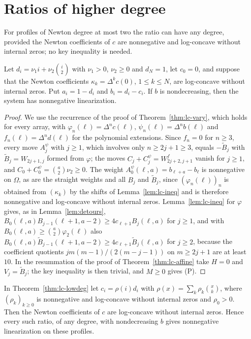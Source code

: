 \section{Ratios of higher degree}\label{sec:higher}
For profiles of Newton degree at most two the ratio can have any degree, provided the Newton coefficients of $c$ are nonnegative and log-concave without internal zeros; no key inequality is needed.

\begin{theorem}\label{thm:lc-lowdeg}
Let $d_i=\nu_1i+\nu_2\binom i2$ with $\nu_1>0$, $\nu_2\geq0$ and $d_N=1$, let $c_0=0$, and suppose that the Newton coefficients $\kappa_k=\Delta^kc(0)$, $1\leq k\leq N$, are log-concave without internal zeros. Put $a_i=1-d_i$ and $b_i=d_i-c_i$. If $b$ is nondecreasing, then the system has nonnegative linearization.
\end{theorem}

\begin{proof}
We use the recurrence of the proof of Theorem~\ref{thm:lc-vary}, which holds for every array, with $\varphi_n(\ell)=\Delta^nc(\ell)$, $\psi_n(\ell)=\Delta^nb(\ell)$ and $f_n(\ell)=\Delta^nd(\ell)$ for the polynomial extensions. Since $f_n=0$ for $n\geq3$, every move $A^\psi_j$ with $j\geq1$, which involves only $n\geq2j+1\geq3$, equals $-\widetilde B_j$ with $\widetilde B_j=W_{2j+1,j}$ formed from $\varphi$; the moves $C_j+C^\psi_j=W^f_{2j+2,j+1}$ vanish for $j\geq1$, and $C_0+C^\psi_0=\binom a2\nu_2\geq0$. The weight $A^\psi_0(\ell,a)=b_{\ell+a}-b_\ell$ is nonnegative on $\Omega$, as are the straight weights and all $B_j$ and $\widetilde B_j$, since $(\varphi_n(\ell))_n$ is obtained from $(\kappa_k)$ by the shifts of Lemma~\ref{lem:lc-ineq} and is therefore nonnegative and log-concave without internal zeros. Lemma~\ref{lem:lc-ineq} for $\varphi$ gives, as in Lemma~\ref{lem:detours}, $B_0(\ell,a)B_{j-1}(\ell+1,a-2)\geq4c_{\ell+1}B_j(\ell,a)$ for $j\geq1$, and with $B_0(\ell,a)\geq\binom a2\varphi_2(\ell)$ also $B_0(\ell,a)\widetilde B_{j-1}(\ell+1,a-2)\geq4c_{\ell+1}\widetilde B_j(\ell,a)$ for $j\geq2$, because the coefficient quotients $jm(m-1)/(2(m-j-1))$ on $m\geq2j+1$ are at least $10$. In the resummation of the proof of Theorem~\ref{thm:lc-affine} take $H=0$ and $V_j=\widetilde B_j$; the key inequality is then trivial, and $M\geq0$ gives (P).
\end{proof}

\begin{corollary}\label{cor:lc-lowdeg}
In Theorem~\ref{thm:lc-lowdeg} let $c_i=\rho(i)d_i$ with $\rho(x)=\sum_k\rho_k\binom xk$, where $(\rho_k)_{k\geq0}$ is nonnegative and log-concave without internal zeros and $\rho_0>0$. Then the Newton coefficients of $c$ are log-concave without internal zeros. Hence every such ratio, of any degree, with nondecreasing $b$ gives nonnegative linearization on these profiles.
\end{corollary}

